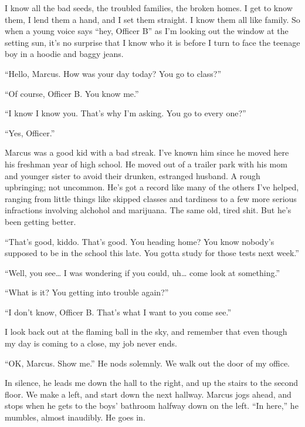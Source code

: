 I know all the bad seeds, the troubled families, the broken homes.
I get to know them, I lend them a hand, and I set them straight. I
know them all like family. So when a young voice says ``hey, Officer
B'' as I'm looking out the window at the setting sun, it's no
surprise that I know who it is before I turn to face the teenage
boy in a hoodie and baggy jeans.



``Hello, Marcus. How was your day today? You go to class?''

``Of course, Officer B. You know me.''

``I know I know you. That's why I'm asking. You go to every
one?''

``Yes, Officer.''



Marcus was a good kid with a bad streak. I've known him since he
moved here his freshman year of high school. He moved out of a
trailer park with his mom and younger sister to avoid their
drunken, estranged husband. A rough upbringing; not uncommon. He's
got a record like many of the others I've helped, ranging from
little things like skipped classes and tardiness to a few more
serious infractions involving alchohol and marijuana. The same old,
tired shit. But he's been getting better.



``That's good, kiddo. That's good. You heading home? You know
nobody's supposed to be in the school this late. You gotta study
for those tests next week.''

``Well, you see{\ldots} I was wondering if you could, uh{\ldots} come look at
something.''

``What is it? You getting into trouble again?''

``I don't know, Officer B. That's what I want to you come
see.''



I look back out at the flaming ball in the sky, and remember that
even though my day is coming to a close, my job never ends.



``OK, Marcus. Show me.'' He nods solemnly. We walk out the door of my
office.



In silence, he leads me down the hall to the right, and up the
stairs to the second floor. We make a left, and start down the next
hallway. Marcus jogs ahead, and stops when he gets to the boys'
bathroom halfway down on the left. ``In here,'' he mumbles, almost
inaudibly. He goes in.



